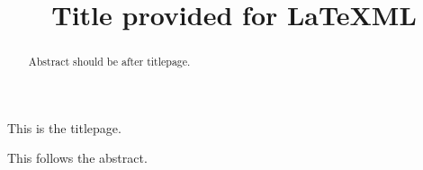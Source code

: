 \documentclass{report}
\title{Title provided for LaTeXML}
\begin{document}
\begin{titlepage}
\huge
This is the titlepage.
\end{titlepage}

\begin{abstract}
Abstract should be after titlepage.
\end{abstract}

This follows the abstract.
\end{document}
